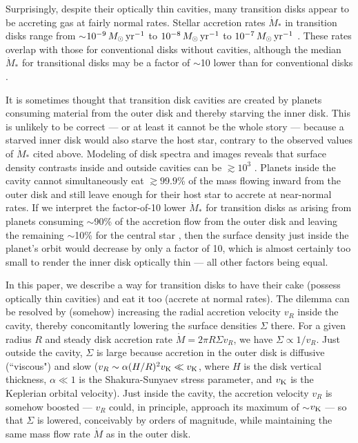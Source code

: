 Surprisingly, despite their optically thin cavities, many transition disks 
appear to be accreting gas at fairly normal rates.  Stellar accretion rates 
$\dot{M}_\ast$ in transition disks range from 
$\sim$$10^{-9}\,M_\odot\,{\rm yr}^{-1}$ \citep[TW Hya;][]{muzerolle00} to 
$10^{-8} \,M_\odot\,{\rm yr}^{-1}$ \citep[GM Aur;][]{gullbring98,Calvet05} to 
$10^{-7}\, M_\odot\,{\rm yr}^{-1}$ \citep[HD 142527;][]{garcia06}.  These rates 
overlap with those for conventional disks without cavities, although the median
$\dot{M}_\ast$ for transitional disks may be a factor of $\sim$10 lower than 
for conventional disks \citep{najita07,espaillat12,Kim13}.

It is sometimes thought that transition disk cavities are created by planets 
consuming material from the outer disk and thereby starving the inner disk.  
This is unlikely to be correct --- or at least it cannot be the whole story --- 
because a starved inner disk would also starve the host star, contrary to the 
observed values of $\dot{M}_\ast$ cited above.  Modeling of disk spectra and 
images reveals that surface density contrasts inside and outside cavities can 
be $\gtrsim 10^3$ \citep[e.g.,][]{Calvet05}.  Planets inside the cavity cannot
simultaneously eat $\gtrsim 99.9$\% of the mass flowing inward from the outer 
disk and still leave enough for their host star to accrete at near-normal 
rates.  If we interpret the factor-of-10 lower $\dot{M}_\ast$ for transition 
disks as arising from planets consuming $\sim$90\% of the accretion flow 
from the outer disk and leaving the remaining $\sim$10\% for the central star 
\citep[e.g.,][]{lubow06}, then the surface density just inside the planet's 
orbit would decrease by only a factor of 10, which is almost certainly too 
small to render the inner disk optically thin --- all other factors being 
equal.

In this paper, we describe a way for transition disks to have their cake 
(possess optically thin cavities) and eat it too (accrete at normal rates).  
The dilemma can be resolved by (somehow) increasing the radial accretion 
velocity $v_R$ inside the cavity, thereby concomitantly lowering the surface 
densities $\Sigma$ there.  For a given radius $R$ and steady disk accretion 
rate $\dot{M} = 2\pi R \Sigma v_R$, we have $\Sigma \propto 1/v_R$.  Just 
outside the cavity, $\Sigma$ is large because accretion in the outer disk is 
diffusive (``viscous") and slow ($v_R \sim \alpha (H/R)^2 v_{\rm K} \ll v_{\rm
 K}$, where $H$ is the disk vertical thickness, $\alpha \ll 1$ is the 
Shakura-Sunyaev stress parameter, and $v_{\rm K}$ is the Keplerian orbital 
velocity).  Just inside the cavity, the accretion velocity $v_R$ is somehow 
boosted --- $v_R$ could, in principle, approach its maximum of 
$\sim$$v_{\rm K}$ --- so that $\Sigma$ is lowered, conceivably by orders of 
magnitude, while maintaining the same mass flow rate $\dot{M}$ as in the outer 
disk.  


